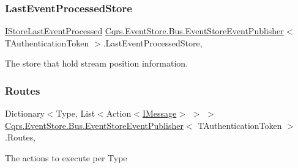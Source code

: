 \subsubsection{\texorpdfstring{Last\+Event\+Processed\+Store}{LastEventProcessedStore}}
{\footnotesize\ttfamily \hyperlink{interfaceCqrs_1_1Bus_1_1IStoreLastEventProcessed}{I\+Store\+Last\+Event\+Processed} \hyperlink{classCqrs_1_1EventStore_1_1Bus_1_1EventStoreEventPublisher}{Cqrs.\+Event\+Store.\+Bus.\+Event\+Store\+Event\+Publisher}$<$ T\+Authentication\+Token $>$.Last\+Event\+Processed\+Store\hspace{0.3cm}{\ttfamily [get]}, {\ttfamily [protected]}}



The store that hold stream position information. 

\mbox{\label{classCqrs_1_1EventStore_1_1Bus_1_1EventStoreEventPublisher_a89bf01d1921bc517ea8b385c0ee724ee_a89bf01d1921bc517ea8b385c0ee724ee}} 
\subsubsection{\texorpdfstring{Routes}{Routes}}
{\footnotesize\ttfamily Dictionary$<$Type, List$<$Action$<$\hyperlink{interfaceCqrs_1_1Messages_1_1IMessage}{I\+Message}$>$ $>$ $>$ \hyperlink{classCqrs_1_1EventStore_1_1Bus_1_1EventStoreEventPublisher}{Cqrs.\+Event\+Store.\+Bus.\+Event\+Store\+Event\+Publisher}$<$ T\+Authentication\+Token $>$.Routes\hspace{0.3cm}{\ttfamily [get]}, {\ttfamily [protected]}}



The actions to execute per Type 

